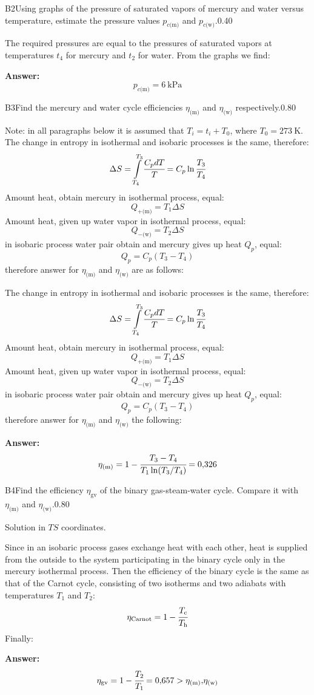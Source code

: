 \documentclass[11pt,a4paper]{article}
\begin{document}
\begin{solcard}{B2}{Using graphs of the pressure of saturated vapors of mercury and water versus temperature, estimate the pressure values $p_{c\text{(m)}}$ and $p_{c\text{(w)}}$.}{0.40}

The required pressures are equal to the pressures of saturated vapors at temperatures $t_4$ for mercury and $t_2$ for water. From the graphs we find:

\par\smallskip\noindent\textbf{Answer:} $$p_{c\text{(m)}}=6~\text{kPa} $$
\end{solcard}

\begin{solcard}{B3}{Find the mercury and water cycle efficiencies $\eta_\text{(m)}$ and $\eta_\text{(w)}$ respectively.}{0.80}

Note: in all paragraphs below it is assumed that $T_i=t_i+T_0$, where $T_0=273~\text{K}$. The change in entropy in isothermal and isobaric processes is the same, therefore: $$\Delta{S}=\int\limits_{T_4}^{T_3}\cfrac{C_pdT}{T}=C_p\ln\cfrac{T_3}{T_4} $$ Amount heat, obtain mercury in isothermal process, equal: $$
Q_{+\text{(m)}}=T_1\Delta{S} $$ Amount heat, given up water vapor in isothermal process, equal: $$
Q_{-\text{(w)}}=T_2\Delta{S} $$ in isobaric process water pair obtain and mercury gives up heat $Q_p$, equal: $$
Q_p=C_p(T_3-T_4) $$ therefore answer for $\eta_\text{(m)}$ and $\eta_\text{(w)}$ are as follows:


The change in entropy in isothermal and isobaric processes is the same, therefore: $$\Delta{S}=\int\limits_{T_4}^{T_3}\cfrac{C_pdT}{T}=C_p\ln\cfrac{T_3}{T_4} $$ Amount heat, obtain mercury in isothermal process, equal: $$
Q_{+\text{(m)}}=T_1\Delta{S} $$ Amount heat, given up water vapor in isothermal process, equal: $$
Q_{-\text{(w)}}=T_2\Delta{S} $$ in isobaric process water pair obtain and mercury gives up heat $Q_p$, equal: $$
Q_p=C_p(T_3-T_4) $$ therefore answer for $\eta_\text{(m)}$ and $\eta_\text{(w)}$ the following:

\par\smallskip\noindent\textbf{Answer:} $$\eta_\text{(m)}=1-\cfrac{T_3-T_4}{T_1\ln(T_3/T_4)}=0{,}326 $$
\end{solcard}

\begin{solcard}{B4}{Find the efficiency $\eta_\text{gv}$ of the binary gas-steam-water cycle. Compare it with $\eta_\text{(m)}$ and $\eta_\text{(w)}$.}{0.80}

Solution in $TS$ coordinates.


Since in an isobaric process gases exchange heat with each other, heat is supplied from the outside to the system participating in the binary cycle only in the mercury isothermal process. Then the efficiency of the binary cycle is the same as that of the Carnot cycle, consisting of two isotherms and two adiabats with temperatures $T_1$ and $T_2$: $$\eta_\text{Carnot}=1-\cfrac{T_\text{c}}{T_\text{h}} $$ Finally:

\par\smallskip\noindent\textbf{Answer:} $$\eta_\text{gv}=1-\cfrac{T_2}{T_1}=0{,}657>\eta_\text{(m)}{,}\eta_\text{(w)} $$
\end{solcard}
\end{document}
